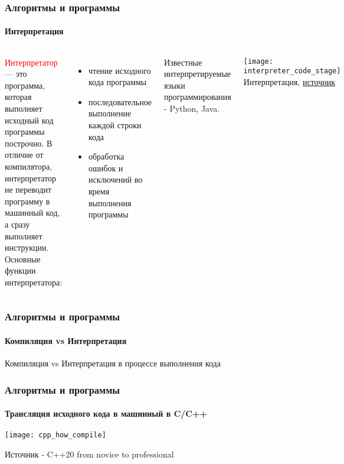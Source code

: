 \documentclass[aspectratio=169]{beamer}
\begin{document}
\begin{frame}
\frametitle{Алгоритмы и программы}
\framesubtitle{Интерпретация}
\begin{block}{}
\begin{columns}[]
\column{\dimexpr\linewidth-40mm}
\justifying
\small
\textcolor{red}{Интерпретатор} — это программа, которая выполняет исходный код программы построчно. В отличие от компилятора, интерпретатор не переводит программу в машинный код, а сразу выполняет инструкции.\newline\newline
Основные функции интерпретатора:
\begin{itemize}
\item{чтение исходного кода программы}
\item{последовательное выполнение каждой строки кода}
\item{обработка ошибок и исключений во время выполнения программы}
\end{itemize}

Известные интерпретируемые языки программирования - Python, Java.

\column{40mm}

\texttt{[image: interpreter\_code\_stage]}
\centering
\tiny Интерпретация, \href{https://ya.ru}{источник} 

\end{columns}
\end{block}
\end{frame}

\begin{frame}
\frametitle{Алгоритмы и программы}
\framesubtitle{Компиляция vs Интерпретация}
\justifying
\small
\centering
Компиляция vs Интерпретация в процессе выполнения кода

\begin{figure}
    \captionsetup[subfigure]{labelformat=empty}
    \centering
\end{figure}
\end{frame}

\begin{frame}
\frametitle{Алгоритмы и программы}
\framesubtitle{Трансляция исходного кода в машинный в C/C++}
\justifying
\small
\centering
\texttt{[image: cpp\_how\_compile]}

\scriptsize Источник - C++20 from novice to professional
\end{frame}
\end{document}

